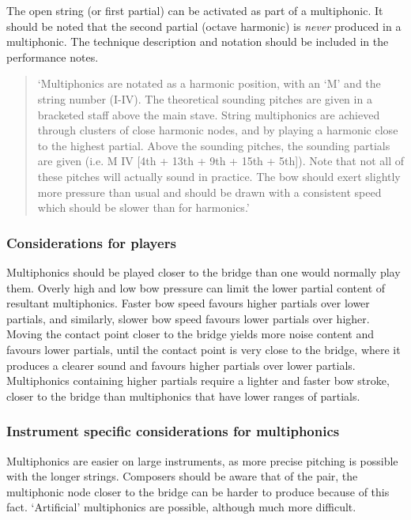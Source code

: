 The open string (or first partial) can be activated as part of a multiphonic.\autocite[161]{welbanksFoundationsModernCello}
It should be noted that the second partial (octave harmonic) is \emph{never} produced in a multiphonic.
The technique description and notation should be included in the performance notes.

\begin{quotation}
  `Multiphonics are notated as a harmonic position, with an `M' and the string number (I-IV). 
  The theoretical sounding pitches are given in a bracketed staff above the main stave.
  String multiphonics are achieved through clusters of close harmonic nodes, and by playing a harmonic close to the highest partial.
  Above the sounding pitches, the sounding partials are given (i.e. M IV [4th + 13th + 9th + 15th + 5th]).
  Note that not all of these pitches will actually sound in practice.
  The bow should exert slightly more pressure than usual and should be drawn with a consistent speed which should be slower than for harmonics.'
\end{quotation}

\subsubsection{Considerations for players}
Multiphonics should be played closer to the bridge than one would normally play them.
Overly high and low bow pressure can limit the lower partial content of resultant multiphonics.
Faster bow speed favours higher partials over lower partials, and similarly, slower bow speed favours lower partials over higher.
Moving the contact point closer to the bridge yields more noise content and favours lower partials, until the contact point is very close to the bridge, where it produces a clearer sound and favours higher partials over lower partials.\autocite[http://www.cellomap.com/index/the-string/multiphonics-and-other-multiple-sounds.html]{fallowfieldCelloMap}
Multiphonics containing higher partials require a lighter and faster bow stroke, closer to the bridge than multiphonics that have lower ranges of partials.\autocite[165]{welbanksFoundationsModernCello}


\subsubsection{Instrument specific considerations for multiphonics}
Multiphonics are easier on large instruments, as more precise pitching is possible with the longer strings.
Composers should be aware that of the pair, the multiphonic node closer to the bridge can be harder to produce because of this fact.
`Artificial' multiphonics are possible, although much more difficult.\autocite[772]{guettlerBowedstringMultiphonicsAnalyzed2012}

